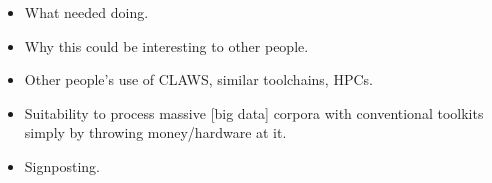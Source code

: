 \begin{itemize}
    \item What needed doing.
    \item Why this could be interesting to other people.
    \item Other people's use of CLAWS, similar toolchains, HPCs.
    \item Suitability to process massive [big data] corpora with conventional toolkits simply by throwing money/hardware at it.
    \item Signposting.
\end{itemize}
